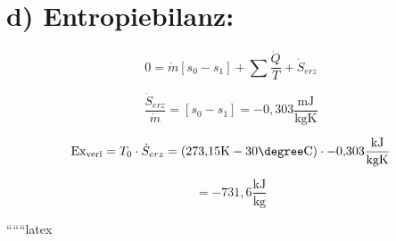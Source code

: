 \section*{d) Entropiebilanz:}

\[
0 = \dot{m} \left[ s_0 - s_1 \right] + \sum \frac{\dot{Q}}{T} + \dot{S}_{erz}
\]

\[
\frac{\dot{S}_{erz}}{\dot{m}} = \left[ s_0 - s_1 \right] = -0{,}303 \frac{\text{mJ}}{\text{kgK}}
\]

\[
\text{Ex}_{\text{verl}} = T_0 \cdot \dot{S}_{erz} = \left( 273{,}15 \text{K} - 30 \degree \text{C} \right) \cdot -0{,}303 \frac{\text{kJ}}{\text{kgK}}
\]

\[
= -731{,}6 \frac{\text{kJ}}{\text{kg}}
\]

``````latex